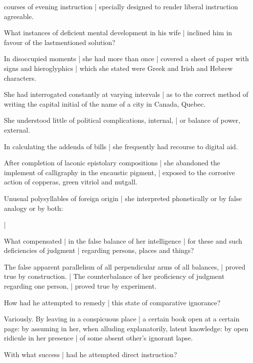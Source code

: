 \Poetry
courses of evening instruction |
specially designed to render liberal instruction agreeable.


What instances of deficient mental development in his wife |
inclined him in favour of the lastmentioned
solution?

\Household
In disoccupied moments |
she had more than once |
covered a sheet of paper with signs and hieroglyphics |
which she stated were Greek and Irish and Hebrew characters.

\Places
She had interrogated constantly at varying intervals |
as to the correct method of writing the capital initial
of the name of a city in Canada, Quebec.

\Philosophy
She understood little of political complications, internal, |
or balance of power, external.

\Memories
In calculating the addenda of bills |
she frequently had recourse to digital aid.

\Religious
After completion of laconic epistolary compositions |
she abandoned the implement of calligraphy in the encaustic pigment, |
exposed to the corrosive action of copperas, green vitriol and nutgall.

\Factual
Unusual polysyllables of foreign origin |
she interpreted phonetically or by false analogy or by both:

\Science
{}
 |

\Poetry
{} 


What compensated |
in the false balance of her intelligence |
for these and such deficiencies of judgment |
regarding persons, places and things?

\Philosophy
The false apparent parallelism
of all perpendicular arms of all balances, |
proved true by construction. |
The counterbalance of her proficiency of judgment regarding one person, |
proved true by experiment.


How had he attempted to remedy |
this state of comparative ignorance?

\Factual
Variously.
By leaving in a conspicuous place |
a certain book open at a certain page:
by assuming in her,
when alluding explanatorily,
latent knowledge:
by open ridicule in her presence |
of some absent other's ignorant lapse.


With what success |
had he attempted direct instruction?

